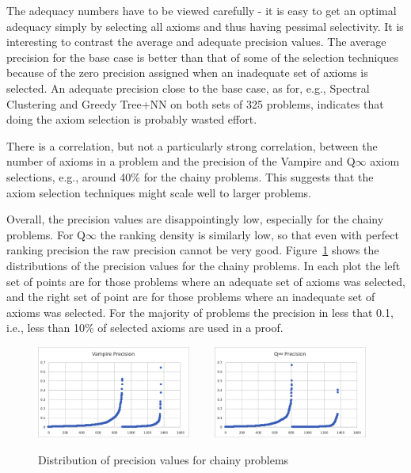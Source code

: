 \documentclass[EPiC]{easychair}
\begin{document}
The adequacy numbers have to be viewed carefully - it is easy to get an
optimal adequacy simply by selecting all axioms and thus having pessimal
selectivity.
It is interesting to contrast the average and adequate precision values.
The average precision for the base case is better than that of some of the
selection techniques because of the zero precision assigned when an inadequate
set of axioms is selected.
An adequate precision close to the base case, as for, e.g., Spectral 
Clustering and Greedy Tree+NN on both sets of 325 problems,
indicates that doing the axiom selection is probably wasted effort.

There is a correlation, but not a particularly strong correlation, between 
the number of axioms in a problem and the precision of the Vampire and 
Q$\infty$ axiom selections, e.g., around 40\% for the chainy problems.
This suggests that the axiom selection techniques might scale well to
larger problems.

Overall, the precision values are disappointingly low, especially for the
chainy problems.
For Q$\infty$ the ranking density is similarly low, so that even with perfect
ranking precision the raw precision cannot be very good.
Figure~\ref{fig:PrcnChainy} shows the distributions of the precision values
for the chainy problems.
In each plot the left set of points are for those problems where an adequate
set of axioms was selected, and the right set of point are for those problems
where an inadequate set of axioms was selected.
For the majority of problems the precision in less that 0.1, i.e., less than
10\% of selected axioms are used in a proof.

\begin{figure}[h]
\centering
\includegraphics[width=0.45\textwidth]{PrcnChainyVampire.png}~~~~
\includegraphics[width=0.45\textwidth]{PrcnChainyQinf.png}
\caption{Distribution of precision values for chainy problems}
\label{fig:PrcnChainy}
\end{figure}
\end{document}
